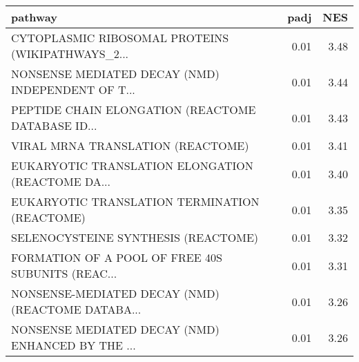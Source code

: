 \begin{tabular}{lrr}
\toprule
                                           pathway &  padj &   NES \\
\midrule
 CYTOPLASMIC RIBOSOMAL PROTEINS (WIKIPATHWAYS\_2... &  0.01 &  3.48 \\
 NONSENSE MEDIATED DECAY (NMD) INDEPENDENT OF T... &  0.01 &  3.44 \\
 PEPTIDE CHAIN ELONGATION (REACTOME DATABASE ID... &  0.01 &  3.43 \\
                 VIRAL MRNA TRANSLATION (REACTOME) &  0.01 &  3.41 \\
 EUKARYOTIC TRANSLATION ELONGATION (REACTOME DA... &  0.01 &  3.40 \\
     EUKARYOTIC TRANSLATION TERMINATION (REACTOME) &  0.01 &  3.35 \\
               SELENOCYSTEINE SYNTHESIS (REACTOME) &  0.01 &  3.32 \\
 FORMATION OF A POOL OF FREE 40S SUBUNITS (REAC... &  0.01 &  3.31 \\
 NONSENSE-MEDIATED DECAY (NMD) (REACTOME DATABA... &  0.01 &  3.26 \\
 NONSENSE MEDIATED DECAY (NMD) ENHANCED BY THE ... &  0.01 &  3.26 \\
\bottomrule
\end{tabular}
